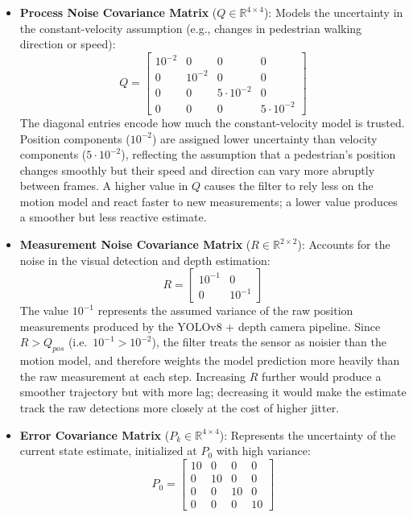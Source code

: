 \begin{itemize}
    \item \textbf{Process Noise Covariance Matrix} ($Q \in \mathbb{R}^{4 \times 4}$): Models the uncertainty in the constant-velocity assumption (e.g., changes in pedestrian walking direction or speed):
    \begin{equation}
        Q = \begin{bmatrix}
            10^{-2} & 0 & 0 & 0 \\
            0 & 10^{-2} & 0 & 0 \\
            0 & 0 & 5 \cdot 10^{-2} & 0 \\
            0 & 0 & 0 & 5 \cdot 10^{-2}
        \end{bmatrix}
    \end{equation}
    The diagonal entries encode how much the constant-velocity model is trusted. Position components ($10^{-2}$) are assigned lower uncertainty than velocity components ($5 \cdot 10^{-2}$), reflecting the assumption that a pedestrian's position changes smoothly but their speed and direction can vary more abruptly between frames. A higher value in $Q$ causes the filter to rely less on the motion model and react faster to new measurements; a lower value produces a smoother but less reactive estimate.

    \item \textbf{Measurement Noise Covariance Matrix} ($R \in \mathbb{R}^{2 \times 2}$): Accounts for the noise in the visual detection and depth estimation:
    \begin{equation}
        R = \begin{bmatrix}
            10^{-1} & 0 \\
            0 & 10^{-1}
        \end{bmatrix}
    \end{equation}
    The value $10^{-1}$ represents the assumed variance of the raw position measurements produced by the YOLOv8 + depth camera pipeline. Since $R > Q_{pos}$ (i.e.\ $10^{-1} > 10^{-2}$), the filter treats the sensor as noisier than the motion model, and therefore weights the model prediction more heavily than the raw measurement at each step. Increasing $R$ further would produce a smoother trajectory but with more lag; decreasing it would make the estimate track the raw detections more closely at the cost of higher jitter.

    \item \textbf{Error Covariance Matrix} ($P_k \in \mathbb{R}^{4 \times 4}$): Represents the uncertainty of the current state estimate, initialized at $P_0$ with high variance:
    \begin{equation}
        P_0 = \begin{bmatrix}
            10 & 0 & 0 & 0 \\
            0 & 10 & 0 & 0 \\
            0 & 0 & 10 & 0 \\
            0 & 0 & 0 & 10
        \end{bmatrix}
    \end{equation}
\end{itemize}

